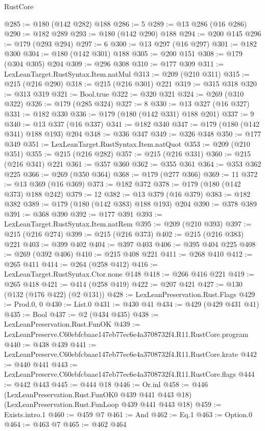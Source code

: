 \begin{lexlean}{RustCore}
\begin{coremodule}
@285 := @180 (@142 @282) @188
@286 := 5
@289 := @13 @286 (@16 @286)
@290 := @182 @289
@293 := @180 (@142 @290) @188
@294 := @200 @145
@296 := @179 (@293 @294)
@297 := 6
@300 := @13 @297 (@16 @297)
@301 := @182 @300
@304 := @180 (@142 @301) @188
@305 := @200 @151
@308 := @179 (@304 @305) @204
@309 := @296 @308
@310 := @177 @309
@311 := LexLeanTarget.RustSyntax.Item.natMul
@313 := @209 (@210 @311)
@315 := @215 (@216 @290)
@318 := @215 (@216 @301) @221
@319 := @315 @318
@320 := @313 @319
@321 := Bool.true
@322 := @320 @321
@324 := @269 (@310 @322)
@326 := @179 (@285 @324)
@327 := 8
@330 := @13 @327 (@16 @327)
@331 := @182 @330
@336 := @179 (@180 (@142 @331) @188 @201)
@337 := 9
@340 := @13 @337 (@16 @337)
@341 := @182 @340
@347 := @179 (@180 (@142 @341) @188 @193) @204
@348 := @336 @347
@349 := @326 @348
@350 := @177 @349
@351 := LexLeanTarget.RustSyntax.Item.natQuot
@353 := @209 (@210 @351)
@355 := @215 (@216 @282)
@357 := @215 (@216 @331)
@360 := @215 (@216 @341) @221
@361 := @357 @360
@362 := @355 @361
@364 := @353 @362 @225
@366 := @269 (@350 @364)
@368 := @179 (@277 @366)
@369 := 11
@372 := @13 @369 (@16 @369)
@373 := @182 @372
@378 := @179 (@180 (@142 @373) @188 @242)
@379 := 12
@382 := @13 @379 (@16 @379)
@383 := @182 @382
@389 := @179 (@180 (@142 @383) @188 @193) @204
@390 := @378 @389
@391 := @368 @390
@392 := @177 @391
@393 := LexLeanTarget.RustSyntax.Item.natRem
@395 := @209 (@210 @393)
@397 := @215 (@216 @274)
@399 := @215 (@216 @373)
@402 := @215 (@216 @383) @221
@403 := @399 @402
@404 := @397 @403
@406 := @395 @404 @225
@408 := @269 (@392 @406)
@410 := @215 @408 @221
@411 := @268 @410
@412 := @265 @411
@414 := @264 (@258 @412)
@416 := LexLeanTarget.RustSyntax.Ctor.none @148
@418 := @266 @416 @221
@419 := @265 @418
@421 := @414 (@258 @419)
@422 := @207 @421
@427 := @130 (@132 (@176 @422) (@2 @131))
@428 := LexLeanPreservation.Rust.Flags
@429 := Prod.{0, 0}
@430 := List.{0}
@431 := @430 @41
@434 := @429 (@429 @431 @41)
@435 := Bool
@437 := @2 (@434 @435)
@438 := LexLeanPreservation.Rust.FunOK
@439 := LexLeanPreserve.C60ebfcbaae147eb77ec6e4a3708732f4.R11.RustCore.program
@440 := @438 @439
@441 := LexLeanPreserve.C60ebfcbaae147eb77ec6e4a3708732f4.R11.RustCore.krate
@442 := @440 @441
@443 := LexLeanPreserve.C60ebfcbaae147eb77ec6e4a3708732f4.R11.RustCore.flags
@444 := @442 @443
@445 := @444 @18
@446 := Or.inl
@458 := @446
    (LexLeanPreservation.Rust.FunOK0 @439 @441 @443 @18)
    (LexLeanPreservation.Rust.FunLoop @439 @441 @443 @18)
@459 := Exists.intro.{1}
@460 := @459 @7
@461 := And
@462 := Eq.{1}
@463 := Option.{0}
@464 := @463 @7
@465 := @462 @464

\end{coremodule}
\end{lexlean}
